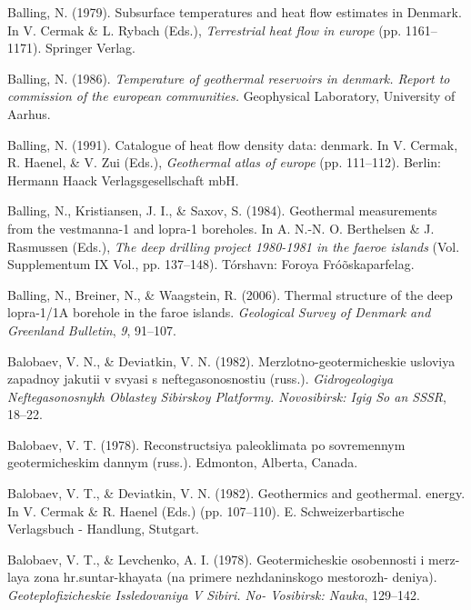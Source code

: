 \documentclass[draft,linenumbers]{agujournal2018}
\begin{document}
\leavevmode{}%
Balling, N. (1979). Subsurface temperatures and heat flow estimates in
{Denmark}. In V. Cermak \& L. Rybach (Eds.), \emph{Terrestrial heat flow
in europe} (pp. 1161--1171). Springer Verlag.

\leavevmode{}%
Balling, N. (1986). \emph{Temperature of geothermal reservoirs in
denmark. Report to commission of the european communities.} Geophysical
Laboratory, University of Aarhus.

\leavevmode{}%
Balling, N. (1991). Catalogue of heat flow density data: denmark. In V.
Cermak, R. Haenel, \& V. Zui (Eds.), \emph{Geothermal atlas of europe}
(pp. 111--112). Berlin: Hermann Haack Verlagsgesellschaft mbH.

\leavevmode{}%
Balling, N., Kristiansen, J. I., \& Saxov, S. (1984). Geothermal
measurements from the vestmanna-1 and lopra-1 boreholes. In A. N.-N. O.
Berthelsen \& J. Rasmussen (Eds.), \emph{The deep drilling project
1980-1981 in the faeroe islands} (Vol. Supplementum IX Vol., pp.
137--148). T{ó}rshavn: F{o}roya Fr{ó}{õ}skaparfelag.

\leavevmode{}%
Balling, N., Breiner, N., \& Waagstein, R. (2006). Thermal structure of
the deep lopra-1/1A borehole in the faroe islands. \emph{Geological
Survey of Denmark and Greenland Bulletin}, \emph{9}, 91--107.

\leavevmode{}%
Balobaev, V. N., \& Deviatkin, V. N. (1982). Merzlotno-geotermicheskie
usloviya zapadnoy jakutii v svyasi s neftegasonosnostiu (russ.).
\emph{Gidrogeologiya Neftegasonosnykh Oblastey Sibirskoy Platformy.
Novosibirsk: Igig So an SSSR}, 18--22.

\leavevmode{}%
Balobaev, V. T. (1978). Reconstructsiya paleoklimata po sovremennym
geotermicheskim dannym (russ.). Edmonton, Alberta, Canada.

\leavevmode{}%
Balobaev, V. T., \& Deviatkin, V. N. (1982). Geothermics and geothermal.
energy. In V. Cermak \& R. Haenel (Eds.) (pp. 107--110). E.
Schweizerbartische Verlagsbuch - Handlung, Stutgart.

\leavevmode{}%
Balobaev, V. T., \& Levchenko, A. I. (1978). Geotermicheskie osobennosti
i merz- laya zona hr.suntar-khayata (na primere nezhdaninskogo
mestorozh- deniya). \emph{Geoteplofizicheskie Issledovaniya V Sibiri.
No- Vosibirsk: Nauka}, 129--142.
\end{document}
